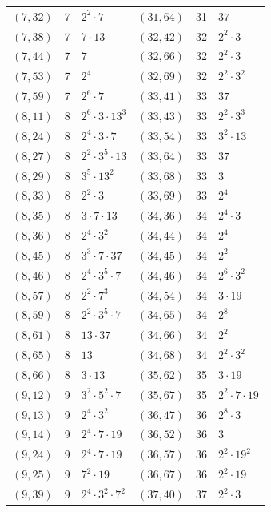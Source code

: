 \documentclass[11pt]{article}
\begin{document}
\begin{longtable}{@{}lrl@{\qquad}lrl@{}}
$(7,32)$ & 7 & $2^{2}\cdot 7$ & $(31,64)$ & 31 & $37$\\
$(7,38)$ & 7 & $7\cdot 13$ & $(32,42)$ & 32 & $2^{2}\cdot 3$\\
$(7,44)$ & 7 & $7$ & $(32,66)$ & 32 & $2^{2}\cdot 3$\\
$(7,53)$ & 7 & $2^{4}$ & $(32,69)$ & 32 & $2^{2}\cdot 3^{2}$\\
$(7,59)$ & 7 & $2^{6}\cdot 7$ & $(33,41)$ & 33 & $37$\\
$(8,11)$ & 8 & $2^{6}\cdot 3\cdot 13^{3}$ & $(33,43)$ & 33 & $2^{2}\cdot 3^{3}$\\
$(8,24)$ & 8 & $2^{4}\cdot 3\cdot 7$ & $(33,54)$ & 33 & $3^{2}\cdot 13$\\
$(8,27)$ & 8 & $2^{2}\cdot 3^{5}\cdot 13$ & $(33,64)$ & 33 & $37$\\
$(8,29)$ & 8 & $3^{5}\cdot 13^{2}$ & $(33,68)$ & 33 & $3$\\
$(8,33)$ & 8 & $2^{2}\cdot 3$ & $(33,69)$ & 33 & $2^{4}$\\
$(8,35)$ & 8 & $3\cdot 7\cdot 13$ & $(34,36)$ & 34 & $2^{4}\cdot 3$\\
$(8,36)$ & 8 & $2^{4}\cdot 3^{2}$ & $(34,44)$ & 34 & $2^{4}$\\
$(8,45)$ & 8 & $3^{3}\cdot 7\cdot 37$ & $(34,45)$ & 34 & $2^{2}$\\
$(8,46)$ & 8 & $2^{4}\cdot 3^{5}\cdot 7$ & $(34,46)$ & 34 & $2^{6}\cdot 3^{2}$\\
$(8,57)$ & 8 & $2^{2}\cdot 7^{3}$ & $(34,54)$ & 34 & $3\cdot 19$\\
$(8,59)$ & 8 & $2^{2}\cdot 3^{5}\cdot 7$ & $(34,65)$ & 34 & $2^{8}$\\
$(8,61)$ & 8 & $13\cdot 37$ & $(34,66)$ & 34 & $2^{2}$\\
$(8,65)$ & 8 & $13$ & $(34,68)$ & 34 & $2^{2}\cdot 3^{2}$\\
$(8,66)$ & 8 & $3\cdot 13$ & $(35,62)$ & 35 & $3\cdot 19$\\
$(9,12)$ & 9 & $3^{2}\cdot 5^{2}\cdot 7$ & $(35,67)$ & 35 & $2^{2}\cdot 7\cdot 19$\\
$(9,13)$ & 9 & $2^{4}\cdot 3^{2}$ & $(36,47)$ & 36 & $2^{8}\cdot 3$\\
$(9,14)$ & 9 & $2^{4}\cdot 7\cdot 19$ & $(36,52)$ & 36 & $3$\\
$(9,24)$ & 9 & $2^{4}\cdot 7\cdot 19$ & $(36,57)$ & 36 & $2^{2}\cdot 19^{2}$\\
$(9,25)$ & 9 & $7^{2}\cdot 19$ & $(36,67)$ & 36 & $2^{2}\cdot 19$\\
$(9,39)$ & 9 & $2^{4}\cdot 3^{2}\cdot 7^{2}$ & $(37,40)$ & 37 & $2^{2}\cdot 3$\\

\end{longtable}
\end{document}
